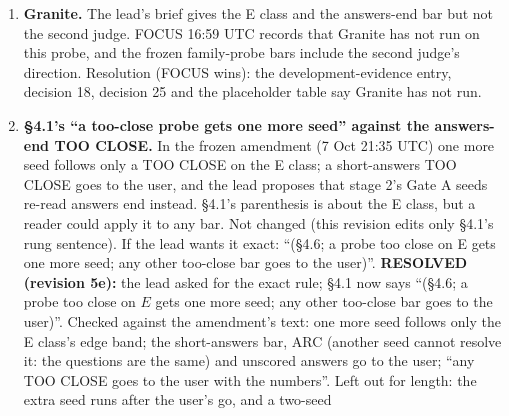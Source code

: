\documentclass{article}
\theoremstyle{plain}
\theoremstyle{definition}
\theoremstyle{remark}
\begin{document}
\begin{enumerate}
{        against FOCUS 16:59 UTC (``the answers-end TOO CLOSE is the user's
        decision''; the lead recommends accepting rung 2 ``for planning'').} The
        body sentence reads as settled while the user has not decided.
        Resolution: the brief's wording is kept, because its parenthesis labels
        the rung as one probe seed of development evidence, to be confirmed by
        stage 2's Gate A, and the pre-registration (FOCUS 15:31 UTC) makes rung
        2 Llama's main-recipe rung if the probe reads partial; these notes mark
        it provisionally filled, pending the user (decisions 18 and 25). If the
        lead wants the body to say so, write ``Llama-3.2-1B's provisional rung
        is \ldots{}'' (one more word). \textbf{RESOLVED (revision 5e):} the lead
        asked for it, because the user has not decided; \S{}4.1 now says
        ``Llama-3.2-1B's provisional rung is \ldots{}''.
  \item \textbf{Granite.} The lead's brief gives the E class and the answers-end
        bar but not the second judge. FOCUS 16:59 UTC records that Granite has
        not run on this probe, and the frozen family-probe bars include the
        second judge's direction. Resolution (FOCUS wins): the
        development-evidence entry, decision 18, decision 25 and the placeholder
        table say Granite has not run.
  \item \textbf{\S{}4.1's ``a too-close probe gets one more seed'' against the
        answers-end TOO CLOSE.} In the frozen amendment (7 Oct 21:35 UTC) one
        more seed follows only a TOO CLOSE on the E class; a short-answers TOO
        CLOSE goes to the user, and the lead proposes that stage 2's Gate A
        seeds re-read answers end instead. \S{}4.1's parenthesis is about the E
        class, but a reader could apply it to any bar. Not changed (this
        revision edits only \S{}4.1's rung sentence). If the lead wants it
        exact: ``(\S{}4.6; a probe too close on E gets one more seed; any other
        too-close bar goes to the user)''. \textbf{RESOLVED (revision 5e):} the
        lead asked for the exact rule; \S{}4.1 now says ``(\S{}4.6; a probe too
        close on $E$ gets one more seed; any other too-close bar goes to the
        user)''. Checked against the amendment's text: one more seed follows
        only the E class's edge band; the short-answers bar, ARC (another seed
        cannot resolve it: the questions are the same) and unscored answers go
        to the user; ``any TOO CLOSE goes to the user with the numbers''. Left
        out for length: the extra seed runs after the user's go, and a two-seed

\end{enumerate}
\end{document}
